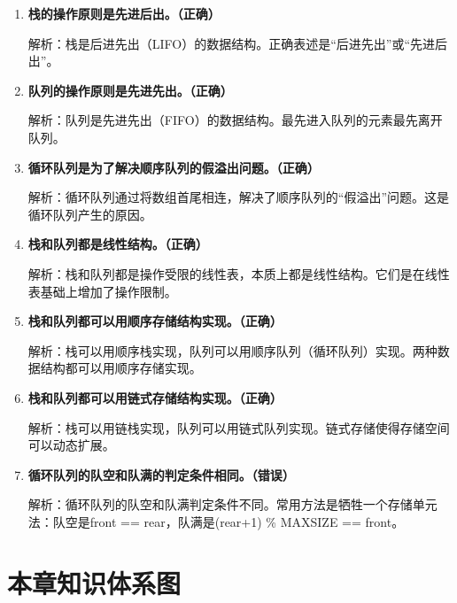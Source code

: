 \documentclass[12pt, a4paper]{article}
\begin{document}
\begin{enumerate}
	\item \textbf{栈的操作原则是先进后出。（正确）}

	      解析：栈是后进先出（LIFO）的数据结构。正确表述是“后进先出”或“先进后出”。

	\item \textbf{队列的操作原则是先进先出。（正确）}

	      解析：队列是先进先出（FIFO）的数据结构。最先进入队列的元素最先离开队列。

	\item \textbf{循环队列是为了解决顺序队列的假溢出问题。（正确）}

	      解析：循环队列通过将数组首尾相连，解决了顺序队列的“假溢出”问题。这是循环队列产生的原因。

	\item \textbf{栈和队列都是线性结构。（正确）}

	      解析：栈和队列都是操作受限的线性表，本质上都是线性结构。它们是在线性表基础上增加了操作限制。

	\item \textbf{栈和队列都可以用顺序存储结构实现。（正确）}

	      解析：栈可以用顺序栈实现，队列可以用顺序队列（循环队列）实现。两种数据结构都可以用顺序存储实现。

	\item \textbf{栈和队列都可以用链式存储结构实现。（正确）}

	      解析：栈可以用链栈实现，队列可以用链式队列实现。链式存储使得存储空间可以动态扩展。

	\item \textbf{循环队列的队空和队满的判定条件相同。（错误）}

	      解析：循环队列的队空和队满判定条件不同。常用方法是牺牲一个存储单元法：队空是front == rear，队满是(rear+1) \% MAXSIZE == front。
\end{enumerate}

\section{本章知识体系图}
\end{document}
